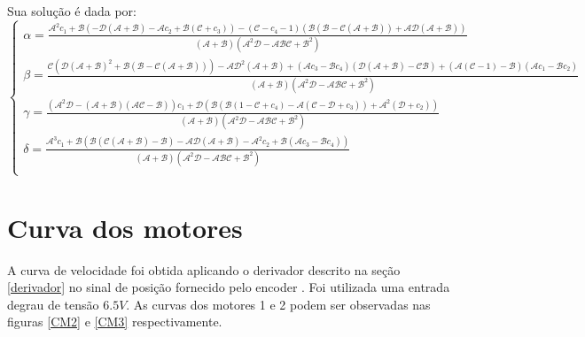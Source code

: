 \documentclass[]{politex}
\begin{document}
Sua solução é dada por:
\begin{equation}
\begin{cases}
\alpha = \frac{\mathcal{A}^2 c_1+\mathcal{B} \left(-\mathcal{D} (\mathcal{A}+\mathcal{B})-\mathcal{A} c_2+ \mathcal{B} (\mathcal{C}+ c_3) \right)-\left(\mathcal{C} -c_4 - 1 \right) (\mathcal{B} (\mathcal{B}-\mathcal{C} (\mathcal{A}+\mathcal{B}))+\mathcal{A} \mathcal{D} (\mathcal{A}+\mathcal{B}))}{(\mathcal{A}+\mathcal{B}) \left(\mathcal{A}^2 \mathcal{D}-\mathcal{A} \mathcal{B} \mathcal{C}+\mathcal{B}^2\right)} \\
\beta = \frac{\mathcal{C} \left( \mathcal{D} (\mathcal{A}+\mathcal{B})^2+ \mathcal{B} (\mathcal{B}-\mathcal{C} (\mathcal{A}+\mathcal{B})) \right)-\mathcal{A} \mathcal{D}^2 (\mathcal{A}+\mathcal{B})+\left(\mathcal{A} c_3- \mathcal{B} c_4 \right) (\mathcal{D} (\mathcal{A}+\mathcal{B})-\mathcal{C} \mathcal{B})+ (\mathcal{A} (\mathcal{C}-1)-\mathcal{B})(\mathcal{A} c_1 - \mathcal{B} c_2)}{(\mathcal{A}+\mathcal{B}) \left(\mathcal{A}^2 \mathcal{D}-\mathcal{A} \mathcal{B} \mathcal{C}+\mathcal{B}^2\right)} \\
\gamma = \frac{ \left(\mathcal{A}^2 \mathcal{D}-(\mathcal{A}+\mathcal{B}) (\mathcal{A} \mathcal{C}-\mathcal{B})\right)c_1 +\mathcal{D} \left(\mathcal{B} \left( \mathcal{B} (1-\mathcal{C} + c_4) - \mathcal{A} (\mathcal{C} - \mathcal{D} + c_3) \right)+\mathcal{A}^2( \mathcal{D}+ c_2) \right)}{(\mathcal{A}+\mathcal{B}) \left(\mathcal{A}^2 \mathcal{D}-\mathcal{A} \mathcal{B} \mathcal{C}+\mathcal{B}^2\right)} \\
\delta = \frac{\mathcal{A}^3 c_1+\mathcal{B} \left(\mathcal{B} (\mathcal{C} (\mathcal{A}+\mathcal{B})-\mathcal{B})-\mathcal{A} \mathcal{D} (\mathcal{A}+\mathcal{B})-\mathcal{A}^2 c_2 +\mathcal{B} \left(\mathcal{A} c_3- \mathcal{B} c_4 \right)\right)}{(\mathcal{A}+\mathcal{B}) \left(\mathcal{A}^2 \mathcal{D}-\mathcal{A} \mathcal{B} \mathcal{C}+\mathcal{B}^2\right)} \\
\end{cases}
\end{equation}



\chapter{Curva dos motores} \label{cap:CurvaDosMotores}

A curva de velocidade foi obtida aplicando o derivador descrito na seção \ref{derivador} no sinal de posição fornecido pelo encoder . Foi utilizada uma entrada degrau de tensão $6.5V$. As curvas dos motores 1 e 2 podem ser observadas nas figuras \ref{CM2} e \ref{CM3} respectivamente.
\end{document}
